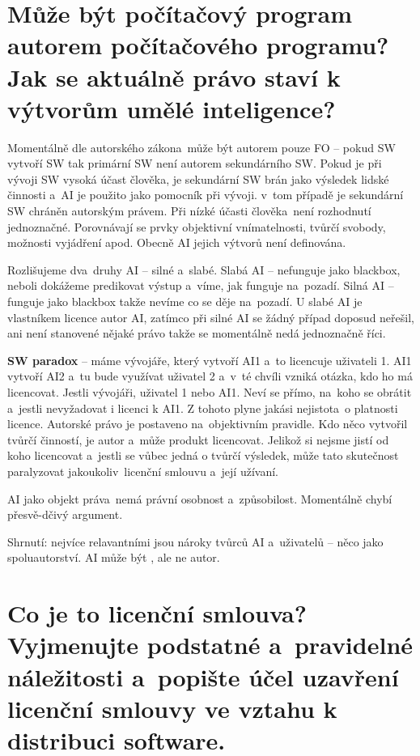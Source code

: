 \section{Může být počítačový program autorem počítačového programu? Jak se aktuálně právo staví k výtvorům umělé inteligence?}

Momentálně dle autorského zákona~může být autorem pouze FO -- pokud SW vytvoří SW tak primární SW není autorem sekundárního SW. Pokud je při vývoji SW vysoká účast člověka, je sekundární SW brán jako výsledek lidské činnosti a~AI je použito jako pomocník při vývoji. v~tom případě je sekundární SW chráněn autorským právem. Při nízké účasti člověka~není rozhodnutí jednoznačné. Porovnávají se prvky objektivní vnímatelnosti, tvůrčí svobody, možnosti vyjádření apod. Obecně AI jejich výtvorů není definována. 

Rozlišujeme dva~druhy AI -- silné a~slabé. Slabá AI -- nefunguje jako blackbox, neboli dokážeme predikovat výstup a~víme, jak funguje na~pozadí. Silná AI -- funguje jako blackbox takže nevíme co se děje na~pozadí. U slabé AI je vlastníkem licence autor AI, zatímco při silné AI se žádný případ doposud neřešil, ani není stanovené nějaké právo takže se momentálně nedá jednoznačně říci.

\textbf{SW paradox} -- máme vývojáře, který vytvoří AI1 a~to licencuje uživateli 1. AI1 vytvoří AI2 a~tu bude využívat uživatel 2 a~v~té chvíli vzniká otázka, kdo ho má licencovat. Jestli vývojáři, uživatel 1 nebo AI1. Neví se přímo, na~koho se obrátit a~jestli nevyžadovat i licenci k AI1. Z tohoto plyne jakási nejistota~o platnosti licence. Autorské právo je postaveno na~objektivním pravidle. Kdo něco vytvořil tvůrčí činností, je autor a~může produkt licencovat. Jelikož si nejsme jistí od koho licencovat a~jestli se vůbec jedná o tvůrčí výsledek, může tato skutečnost paralyzovat jakoukoliv~licenční smlouvu a~její užívaní.

AI jako objekt práva~nemá právní osobnost a~způsobilost. Momentálně chybí přesvě-dčivý argument. 

Shrnutí: nejvíce relavantními jsou nároky tvůrců AI a~uživatelů -- něco jako spoluautorství. AI může být , ale ne autor.

\newpage
\section{Co je to licenční smlouva? Vyjmenujte podstatné a~pravidelné náležitosti a~popište účel uzavření licenční smlouvy ve vztahu k distribuci software.}

